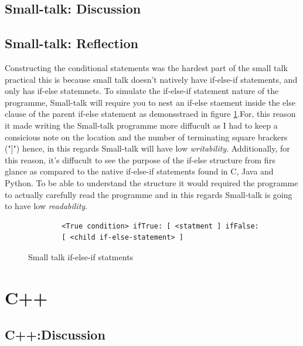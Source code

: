 \documentclass[
	12pt, %
]{fphw}
\begin{document}
\subsection{Small-talk: Discussion}

\subsection{Small-talk: Reflection}

Constructing the conditional statements was the hardest part of the small talk
practical this is because small talk doesn't natively have if-else-if statements,
and only has if-else statemnets. To simulate the if-else-if statement nature of the
programme, Small-talk will require you to nest an if-else staement inside the else
clause of the parent if-else statement as demonsstraed in figure \ref{ST:IF_ELSE}.For,
this reason it made writing the Small-talk programme more diffucult as I had to
keep a consicious note on the location and the number of terminating square brackers
("]") hence, in this regards Small-talk will have low \emph{writability}. Additionally,
for this reason, it's diffucult to see the purpose of the if-else structure from firs
glance as compared to the native if-else-if statements found in C, Java and Python. To
be able to understand the structure it would required the programme to actually
carefully read the programme and in this regards Small-talk is going to have
low \emph{readability}.

\begin{figure}[!htp]
    \begin{problem}
        \begin{verbatim}
        <True condition> ifTrue: [ <statment ] ifFalse:
        [ <child if-else-statement> ]
        \end{verbatim}
    \end{problem}
    \caption{Small talk if-else-if statments}
    \label{ST:IF_ELSE}
\end{figure}

\section{C++}

\subsection{C++:Discussion}
\end{document}
